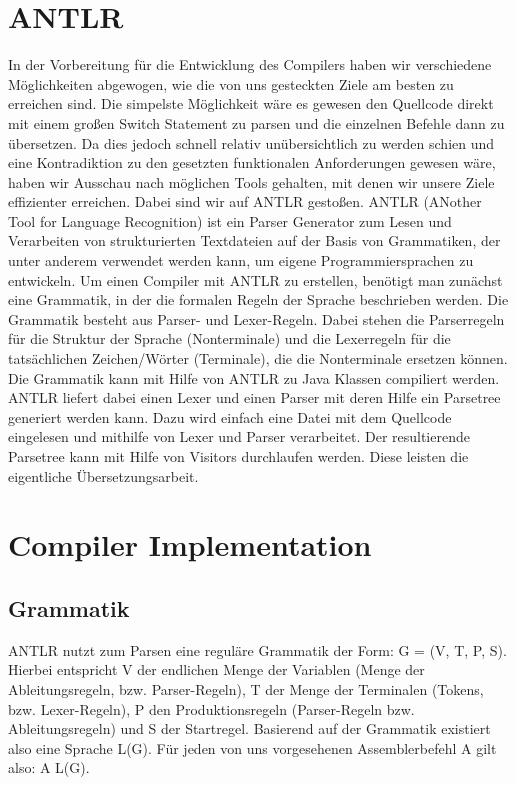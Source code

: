 \documentclass[paper=a4,fontsize=12pt,twocolumn]{scrreprt}
\begin{document}
\section{ANTLR}
In der Vorbereitung für die Entwicklung des Compilers haben wir verschiedene Möglichkeiten abgewogen, wie die von uns gesteckten Ziele am besten zu erreichen sind.
Die simpelste Möglichkeit wäre es gewesen den Quellcode direkt mit einem großen Switch Statement zu parsen und die einzelnen Befehle dann zu übersetzen.
Da dies jedoch schnell relativ unübersichtlich zu werden schien und eine Kontradiktion zu den gesetzten funktionalen Anforderungen gewesen wäre, haben wir Ausschau nach möglichen Tools gehalten, mit denen wir unsere Ziele effizienter erreichen.
Dabei sind wir auf ANTLR gestoßen.
ANTLR (ANother Tool for Language Recognition) ist ein Parser Generator zum Lesen und Verarbeiten von strukturierten Textdateien auf der Basis von Grammatiken, der unter anderem verwendet werden kann, um eigene Programmiersprachen zu entwickeln.
Um einen Compiler mit ANTLR zu erstellen, benötigt man zunächst eine Grammatik, in der die formalen Regeln der Sprache beschrieben werden.
Die Grammatik besteht aus Parser- und Lexer-Regeln.
Dabei stehen die Parserregeln für die Struktur der Sprache (Nonterminale) und die Lexerregeln für die tatsächlichen Zeichen/Wörter (Terminale), die die Nonterminale ersetzen können.
Die Grammatik kann mit Hilfe von ANTLR zu Java Klassen compiliert werden.
ANTLR liefert dabei einen Lexer und einen Parser mit deren Hilfe ein Parsetree generiert werden kann.
Dazu wird einfach eine Datei mit dem Quellcode eingelesen und mithilfe von Lexer und Parser verarbeitet.
Der resultierende Parsetree kann mit Hilfe von Visitors durchlaufen werden.
Diese leisten die eigentliche Übersetzungsarbeit.

\section{Compiler Implementation}

\subsection{Grammatik}
ANTLR nutzt zum Parsen eine reguläre Grammatik der Form: G = (V, T, P, S). Hierbei entspricht V der endlichen Menge der Variablen (Menge der Ableitungsregeln, bzw. Parser-Regeln), T der Menge der Terminalen (Tokens, bzw. Lexer-Regeln), P den Produktionsregeln (Parser-Regeln bzw. Ableitungsregeln) und S der Startregel. Basierend auf der Grammatik existiert also eine Sprache L(G). Für jeden von uns vorgesehenen Assemblerbefehl A gilt also: A \in L(G). 
\end{document}
